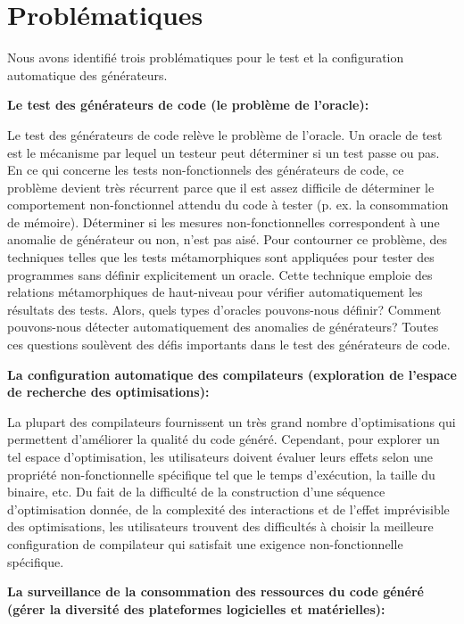 \section*{Probl\'ematiques}
Nous avons identifi\'e trois probl\'ematiques pour le test et la configuration automatique des g\'en\'erateurs.

\textbf{Le test des g\'en\'erateurs de code (le probl\`eme de l'oracle):} 

Le test des g\'en\'erateurs de code rel\`eve le probl\`eme de l'oracle. Un oracle de test est le m\'ecanisme par lequel un testeur peut d\'eterminer si un test passe ou pas. En ce qui 
concerne les tests non-fonctionnels des g\'en\'erateurs de code, ce probl\`eme devient tr\`es r\'ecurrent parce que il est assez difficile de d\'eterminer le comportement non-fonctionnel attendu du code \`a tester (p. ex. la consommation de m\'emoire). D\'eterminer si les mesures non-fonctionnelles correspondent \`a une anomalie de g\'en\'erateur ou non, n'est pas ais\'e. Pour contourner ce probl\`eme, des techniques telles que les tests m\'etamorphiques\cite{chen1998metamorphic} sont appliqu\'ees pour tester des programmes sans d\'efinir explicitement un oracle. Cette technique emploie des relations m\'etamorphiques de haut-niveau pour v\'erifier automatiquement les r\'esultats des tests. Alors, quels types d'oracles pouvons-nous d\'efinir? Comment pouvons-nous d\'etecter automatiquement des anomalies de g\'en\'erateurs? Toutes ces questions soul\`event des d\'efis importants dans le test des g\'en\'erateurs de code.


\textbf{La configuration automatique des compilateurs (exploration de l'espace de recherche des optimisations):}

La plupart des compilateurs fournissent un tr\`es grand nombre d'optimisations qui permettent d'am\'eliorer la qualit\'e du code g\'en\'er\'e. Cependant, pour explorer un tel espace d'optimisation, les utilisateurs doivent \'evaluer leurs effets selon une propri\'et\'e non-fonctionnelle sp\'ecifique tel que le temps d'ex\'ecution, la taille du binaire, etc. Du fait de la difficult\'e de la construction d'une s\'equence d'optimisation donn\'ee, de la complexit\'e des interactions et de l'effet impr\'evisible des optimisations, les utilisateurs trouvent des difficult\'es \`a choisir la meilleure configuration de compilateur qui satisfait une exigence non-fonctionnelle sp\'ecifique.

\newpage
\textbf{La surveillance de la consommation des ressources du code g\'en\'er\'e (g\'erer la diversit\'e des plateformes logicielles et mat\'erielles):}

